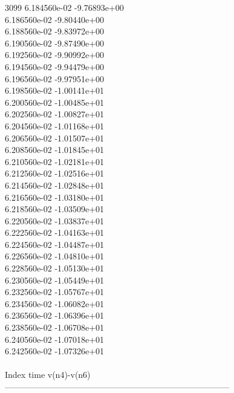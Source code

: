 3099	6.184560e-02	-9.76893e+00	\\ 	6.186560e-02	-9.80440e+00	\\ 	6.188560e-02	-9.83972e+00	\\ 	6.190560e-02	-9.87490e+00	\\ 	6.192560e-02	-9.90992e+00	\\ 	6.194560e-02	-9.94479e+00	\\ 	6.196560e-02	-9.97951e+00	\\ 	6.198560e-02	-1.00141e+01	\\ 	6.200560e-02	-1.00485e+01	\\ 	6.202560e-02	-1.00827e+01	\\ 	6.204560e-02	-1.01168e+01	\\ 	6.206560e-02	-1.01507e+01	\\ 	6.208560e-02	-1.01845e+01	\\ 	6.210560e-02	-1.02181e+01	\\ 	6.212560e-02	-1.02516e+01	\\ 	6.214560e-02	-1.02848e+01	\\ 	6.216560e-02	-1.03180e+01	\\ 	6.218560e-02	-1.03509e+01	\\ 	6.220560e-02	-1.03837e+01	\\ 	6.222560e-02	-1.04163e+01	\\ 	6.224560e-02	-1.04487e+01	\\ 	6.226560e-02	-1.04810e+01	\\ 	6.228560e-02	-1.05130e+01	\\ 	6.230560e-02	-1.05449e+01	\\ 	6.232560e-02	-1.05767e+01	\\ 	6.234560e-02	-1.06082e+01	\\ 	6.236560e-02	-1.06396e+01	\\ 	6.238560e-02	-1.06708e+01	\\ 	6.240560e-02	-1.07018e+01	\\ 	6.242560e-02	-1.07326e+01	\\ \hline
\\ \hline
Index   time            v(n4)-v(n6)     \\ \hline
--------------------------------------------------------------------------------\\ \hline
